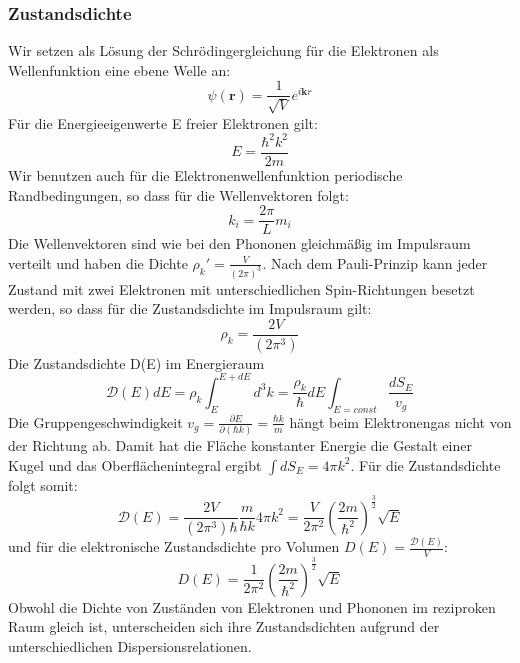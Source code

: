 \documentclass[11pt]{article}
\begin{document}
\subsubsection{Zustandsdichte}
Wir setzen als Lösung der Schrödingergleichung für die Elektronen als
Wellenfunktion eine ebene Welle an:
\begin{equation}
  \psi(\bm{r})=\frac{1}{\sqrt{V}}e^{i\bm{k}{r}}
\end{equation}
Für die Energieeigenwerte E freier Elektronen gilt:
\begin{equation}
  E=\frac{\hbar^2k^2}{2m}
\end{equation}
Wir benutzen auch für die Elektronenwellenfunktion periodische Randbedingungen,
so dass für die Wellenvektoren folgt:
\begin{equation}
  k_i=\frac{2\pi}{L}m_i
\end{equation}
Die Wellenvektoren sind wie bei den Phononen gleichmäßig im Impulsraum verteilt
und haben die Dichte $\rho_k'=\frac{V}{(2\pi)^3}$. Nach dem Pauli-Prinzip kann
jeder Zustand mit zwei Elektronen mit unterschiedlichen Spin-Richtungen besetzt
werden, so dass für die Zustandsdichte im Impulsraum gilt:
\begin{equation}
  \rho_k=\frac{2V}{(2\pi^3)}
\end{equation}
Die Zustandsdichte D(E) im Energieraum
\begin{equation}
  \mathcal{D}(E)dE=\rho_k\int_E^{E+dE}d^3k=\frac{\rho_k}{\hbar}dE\int_{E=const}
  \frac{dS_E}{v_g}
\end{equation}
Die Gruppengeschwindigkeit $v_g=\frac{\partial E}{\partial (\hbar k)}=\frac
{\hbar k}{m}$ hängt beim Elektronengas nicht von der Richtung ab. Damit hat die
Fläche konstanter Energie die Gestalt einer Kugel und das Oberflächenintegral
ergibt $\int dS_E=4\pi k^2$. Für die Zustandsdichte folgt somit:
\begin{equation}
  \mathcal{D}(E)=\frac{2V}{(2\pi^3)\hbar}\frac{m}{\hbar k}4\pi k^2=
  \frac{V}{2\pi^2}\left( \frac{2m}{\hbar^2} \right)^{\frac{3}{2}}\sqrt{E}
\end{equation}
und für die elektronische Zustandsdichte pro Volumen $D(E)=\frac{\mathcal{D}
(E)}{V}$:
\begin{equation}\label{zustands}
  D(E)=\frac{1}{2\pi^2}\left( \frac{2m}{\hbar^2}\right)^{\frac{3}{2}}\sqrt{E}
\end{equation}
Obwohl die Dichte von Zuständen von Elektronen und Phononen im reziproken
Raum gleich ist, unterscheiden sich ihre Zustandsdichten aufgrund der
unterschiedlichen Dispersionsrelationen.
\end{document}
